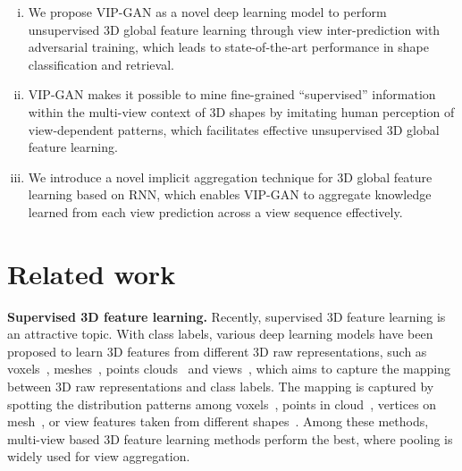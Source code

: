 \documentclass[letterpaper]{article} \usepackage{aaai19}  \usepackage{times}  \usepackage{helvet}  \usepackage{courier}  \usepackage{url}  \usepackage{graphicx}
\begin{document}
\begin{enumerate}[i)]
\item We propose VIP-GAN as a novel deep learning model to perform unsupervised 3D global feature learning through view inter-prediction with adversarial training, which leads to state-of-the-art performance in shape classification and retrieval. \item VIP-GAN makes it possible to mine fine-grained ``supervised'' information within the multi-view context of 3D shapes by imitating human perception of view-dependent patterns, which facilitates effective unsupervised 3D global feature learning.
\item We introduce a novel implicit aggregation technique for 3D global feature learning based on RNN, which enables VIP-GAN to aggregate knowledge learned from each view prediction across a view sequence effectively.\end{enumerate}

\section{Related work}
\noindent\textbf{Supervised 3D feature learning. }Recently, supervised 3D feature learning is an attractive topic. With class labels, various deep learning models have been proposed to learn 3D features from different 3D raw representations, such as voxels~\cite{Wu2015}, meshes~\cite{HanTIP18}, points clouds~\cite{cvprpoint2017,nipspoint17} and views~\cite{tmmbs2016,Bshi2015,Sfikas17,eccvSinha2017,su15mvcnn,JohnsLD16,AsakoCVPR2018}, which aims to capture the mapping between 3D raw representations and class labels. The mapping is captured by spotting the distribution patterns among voxels~\cite{Wu2015}, points in cloud~\cite{cvprpoint2017,nipspoint17}, vertices on mesh~\cite{HanTIP18}, or view features taken from different shapes~\cite{tmmbs2016,Bshi2015,Sfikas17,eccvSinha2017,su15mvcnn,JohnsLD16,AsakoCVPR2018}. Among these methods, multi-view based 3D feature learning methods perform the best, where pooling is widely used for view aggregation.
\end{document}
